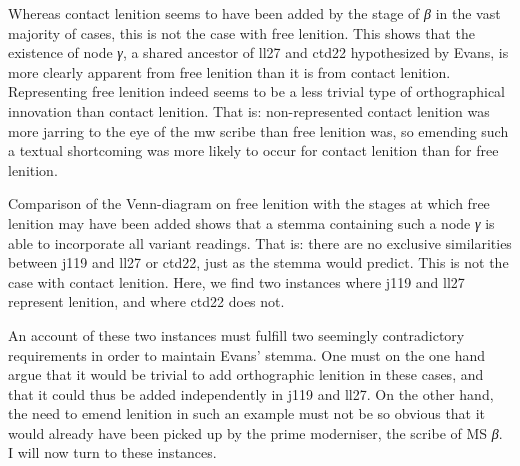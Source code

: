 Whereas contact lenition seems to have been added by the stage of \textit{β} in the vast majority of cases, this is not the case with free lenition. This shows that the existence of node \textit{γ}, a shared ancestor of \gls{ll27} and \gls{ctd22} hypothesized by Evans, is more clearly apparent from free lenition than it is from contact lenition. Representing free lenition indeed seems to be a less trivial type of orthographical innovation than contact lenition. That is: non-represented contact lenition was more jarring to the eye of the \gls{mw} scribe than free lenition was, so emending such a textual shortcoming was more likely to occur for contact lenition than for free lenition.


Comparison of the Venn-diagram on free lenition with the stages at which free lenition may have been added shows that a stemma containing such a node \textit{γ} is able to incorporate all variant readings. That is: there are no exclusive similarities between \gls{j119} and \gls{ll27} or \gls{ctd22}, just as the stemma would predict. This is not the case with contact lenition. Here, we find two instances where \gls{j119} and \gls{ll27} represent lenition, and where \gls{ctd22} does not.

An account of these two instances must fulfill two seemingly contradictory requirements in order to maintain Evans' stemma. One must on the one hand argue that it would be trivial to add orthographic lenition in these cases, and that it could thus be added independently in \gls{j119} and \gls{ll27}. On the other hand, the need to emend lenition in such an example must not be so obvious that it would already have been picked up by the prime moderniser, the scribe of MS \textit{β}. I will now turn to these instances. 

